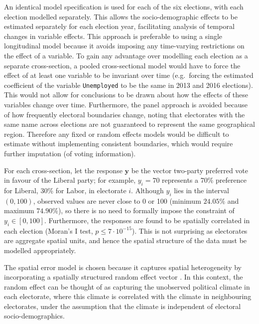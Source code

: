 \documentclass[times, doublespace]{anzsauth}
\begin{document}
An identical model specification is used for each of the six elections, with each election modelled separately. This allows the socio-demographic effects to be estimated separately for each election year, facilitating analysis of temporal changes in variable effects. This approach is preferable to using a single longitudinal model because it avoids imposing any time-varying restrictions on the effect of a variable. To gain any advantage over modelling each election as a separate cross-section, a pooled cross-sectional model would have to force the effect of at least one variable to be invariant over time (e.g.~forcing the estimated coefficient of the variable \texttt{Unemployed} to be the same in 2013 and 2016 elections). This would not allow for conclusions to be drawn about how the effects of these variables change over time. Furthermore, the panel approach is avoided because of how frequently electoral boundaries change, noting that electorates with the same name across elections are not guaranteed to represent the same geographical region. Therefore any fixed or random effects models would be difficult to estimate without implementing consistent boundaries, which would require further imputation (of voting information).

For each cross-section, let the response \(\bm{y}\) be the vector two-party preferred vote in favour of the Liberal party; for example, \(y_i = 70\) represents a 70\% preference for Liberal, 30\% for Labor, in electorate \(i\). Although \(y_i\) lies in the interval \((0,100)\), observed values are never close to 0 or 100 (minimum \(24.05 \%\) and maximum \(74.90 \%\)), so there is no need to formally impose the constraint of \(y_i \in [0,100]\). Furthermore, the responses are found to be spatially correlated in each election (Moran's I test, \(p \le 7\cdot10^{-15}\)). This is not surprising as electorates are aggregate spatial units, and hence the spatial structure of the data must be modelled appropriately.

The spatial error model \citep{Anselin88} is chosen because it captures spatial heterogeneity by incorporating a spatially structured random effect vector \citep{LeSage2009}. In this context, the random effect can be thought of as capturing the unobserved political climate in each electorate, where this climate is correlated with the climate in neighbouring electorates, under the assumption that the climate is independent of electoral socio-demographics.
\end{document}
